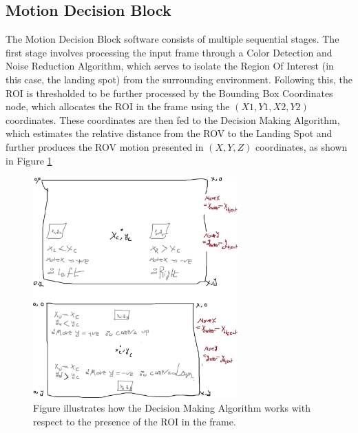 \documentclass{article}
\begin{document}
  
\subsection{Motion Decision Block}
The Motion Decision Block software consists of multiple sequential stages. The first stage involves processing the input frame through a Color Detection and Noise Reduction Algorithm, which serves to isolate the Region Of Interest (in this case, the landing spot) from the surrounding environment. 
Following this, the ROI is thresholded to be further processed by the Bounding Box Coordinates node, which allocates the ROI in the frame using the $(X1,Y1,X2,Y2)$ coordinates. 
These coordinates are then fed to the Decision Making Algorithm, which estimates the relative distance from the ROV to the Landing Spot and further produces the ROV motion presented in $(X,Y,Z)$ coordinates, as shown in Figure \ref{fig:decision}
\begin{figure}[htbp]
    \centering
    \includegraphics[width=0.7\textwidth]{images/motion.jpg}
    \caption{Figure illustrates how the Decision Making Algorithm works with respect to the presence of the ROI in the frame.}
    \label{fig:decision}
\end{figure}
\end{document}
